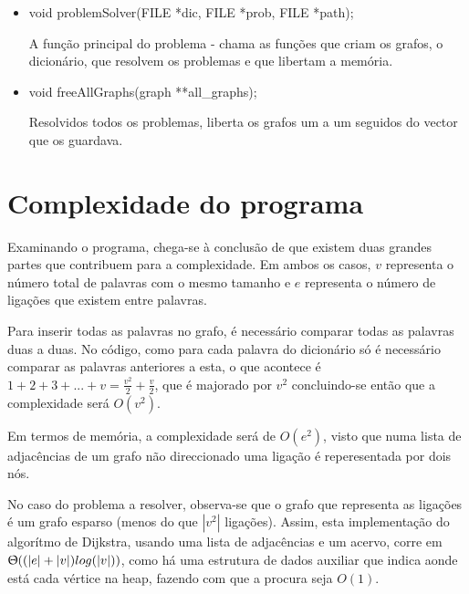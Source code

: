 \documentclass[a4paper, 11pt]{article}
\begin{document}
\begin{itemize}
    \item void problemSolver(FILE *dic, FILE *prob, FILE *path);
    \par A função principal do problema - chama as funções que criam os grafos, o dicionário, que resolvem os problemas e que libertam a memória.
    
    \item void freeAllGraphs(graph **all{\_}graphs);
    \par Resolvidos todos os problemas, liberta os grafos um a um seguidos do vector que os guardava.
    
    \end{itemize}

\section{Complexidade do programa}
    \par Examinando o programa, chega-se à conclusão de que existem duas grandes partes que contribuem para a complexidade. Em ambos os casos, $v$ representa o número total de palavras com o mesmo tamanho e $e$ representa o número de ligações que existem entre palavras.
    \begin{description}[align=left]
        \item[Criação de grafo] Para inserir todas as palavras no grafo, é necessário comparar todas as palavras duas a duas. No código, como para cada palavra do dicionário só é necessário comparar as palavras anteriores a esta, o que acontece é $1 + 2 + 3 + ... + v = \frac{v^2}{2} + \frac{v}{2}$, que é majorado por $v^2$ concluindo-se então que a complexidade será $O(v^2)$.
        \par Em termos de memória, a complexidade será de $O(e^2)$, visto que numa lista de adjacências de um grafo não direccionado uma ligação é reperesentada por dois nós.
        \item[Algorítmo de Dijkstra] No caso do problema a resolver, observa-se que o grafo que representa as ligações é um grafo esparso (menos do que $|v^2|$ ligações). Assim, esta implementação do algorítmo de Dijkstra, usando uma lista de adjacências e um acervo, corre em $\Uptheta((|e| + |v|)log(|v|))$, como há uma estrutura de dados auxiliar que indica aonde está cada vértice na heap, fazendo com que a procura seja $O(1)$.
    \end{description}
\end{document}
